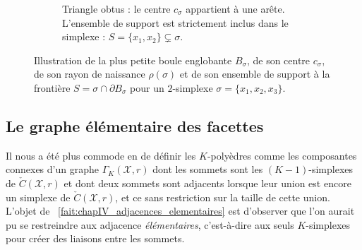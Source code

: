 \begin{figure}[!h]
\begin{subfigure}[b]{0.48\textwidth}
        \caption{Triangle obtus : le centre $c_\sigma$ appartient à une arête. L'ensemble de support est strictement inclus dans le simplexe : $S = \{x_1,x_2\} \subsetneq \sigma$.}
        \label{fig:support_obtusangle}
    \end{subfigure}
    \caption{Illustration de la plus petite boule englobante $B_\sigma$, de son centre $c_\sigma$, de son rayon de naissance $\rho(\sigma)$ et de son ensemble de support à la frontière $S = \sigma \cap \partial B_\sigma$ pour un $2$-simplexe $\sigma=\{x_1,x_2,x_3\}$.}
    \label{fig:illustrations_definitions_simplexe}
\end{figure}


\subsection{Le graphe élémentaire des facettes}

Il nous a été plus commode en  de définir les $K$-polyèdres comme les composantes connexes d'un graphe $\Gamma_K(\mathcal X,r)$ dont les sommets sont les $(K-1)$-simplexes de $\check C(\mathcal X,r)$ et dont deux sommets sont adjacents lorsque leur union est encore un simplexe de $\check C(\mathcal X,r)$, et ce sans restriction sur la taille de cette union. 
L'objet de \Fact~\ref{fait:chapIV_adjacences_elementaires} est d'observer que l'on aurait pu se restreindre aux adjacence \emph{élémentaires}, c'est-à-dire aux seuls $K$-simplexes pour créer des liaisons entre les sommets.


